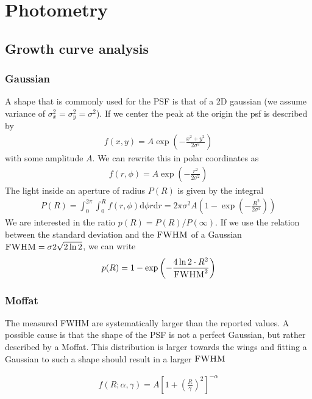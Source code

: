 \chapter{Photometry}

\section{Growth curve analysis}


\subsection{Gaussian}

A shape that is commonly used for the PSF is that of a 2D gaussian (we assume  variance of $\sigma_x^2 = \sigma_y^2 = \sigma^2$). If we center the peak at the origin the \gls{psf} is described by
\begin{align}
f(x,y) = A \exp\left(-\frac{x^2+y^2}{2\sigma^2}\right)
\end{align}
with some amplitude $A$. We can rewrite this in polar coordinates as 
\begin{align}
f(r,\phi) = A \exp\left(-\frac{r^2}{2\sigma^2}\right)
\end{align}
The light inside an aperture of radius $P(R)$ is given by the integral
\begin{align}
P(R) = \int_0^{2\pi} \int_0^R f(r,\phi) \mathrm{d} \phi r \mathrm{d} r = 2\pi \sigma^2 A \left(1-\exp \left(-\frac{R^2}{2\sigma^2}\right) \right) 
\end{align}
We are interested in the ratio $p(R) = P(R) / P(\infty)$. If we use the relation between the standard deviation and the $\textsc{FWHM}$ of a Gaussian $\textsc{FWHM} = \sigma  2\sqrt{2\ln2}$, we can write
\begin{align}
p(R) = 1-\exp\left(- \frac{4 \ln 2 \cdot R^2}{\textsc{FWHM}^2} \right)
\end{align}

\subsection{Moffat}

The measured FWHM are systematically larger than the reported values. A possible cause is that the shape of the PSF is not a perfect Gaussian, but rather described by a Moffat. This distribution is larger towards the wings and fitting a Gaussian to such a shape should result in a larger $\textsc{FWHM}$

\begin{align}
f(R;\alpha,\gamma) = A \left[1 + \left(\frac{R}{\gamma}\right)^2 \right]^{- \alpha}
\end{align}


